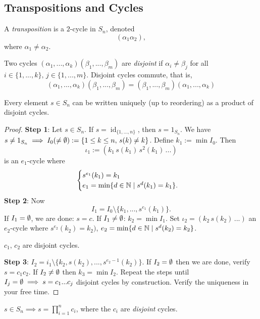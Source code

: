 \subsection{Transpositions and Cycles}
\begin{definition}[Transpositions]
   A \emph{transposition} is a $2$-cycle in $S_n$, denoted  \[
       (\alpha_1 \alpha_2),
   \]
   where $\alpha_1 \neq \alpha_2$.
\end{definition}

\begin{definition}
    Two cycles $(\alpha_1,...,\alpha_k)(\beta_1,...,\beta_m)$ are \emph{disjoint} if $\alpha_i \neq \beta_j$ for all $i \in \{1,...,k\}, \, j \in \{1,...,m\}$. 
    Disjoint cycles commute, that is, \[
        (\alpha_1,...,\alpha_k)(\beta_1,...,\beta_m)=(\beta_1,...,\beta_m)(\alpha_1,...,\alpha_k)
    \]
\end{definition}
\begin{lemma}
    Every element $s\in S_n$ can be written uniquely (up to reordering) as a product of disjoint cycles.
\end{lemma}
\begin{proof}
    \textbf{Step 1}: Let $s\in S_n$. If $s=\operatorname{id}_{\{1,...,n\} }$, then $s=1_{S_n}$. We have $s \neq 1_{S_n} \implies I_0 (\neq \emptyset) := \{1 \leq k \leq n, \, s(k) \neq k\} $. Define $k_1 := \operatorname{min}I_0.$ Then \[
        \iota_1 := ( k_1 \,s(k_1) \, s^2(k_1)\, ... ) 
    \]
   is an $e_1$-cycle where \[
   \begin{cases}
       s^{e_1}(k_1) =k_1 \\
       e_1=\operatorname{min} \{d \in \mathbb{N}  \mid s^{d}(k_1)=k_1\}.
   \end{cases}
   \]
   \textbf{Step 2}: Now \[
       I_1=I_0\setminus \{k_1,...,s^{e_1}(k_1)\}.
   \]
   If $I_1=\emptyset$, we are done: $s = c.$ If $I_1\neq\emptyset$: $k_2=\operatorname{min}I_1$. Set $\iota_2=(k_2\,s(k_2)\,...)$ an $e_2$-cycle where $s^{e_2}(k_2)=k_2)$, $e_2=\operatorname{min}\{d\in \mathbb{N} \mid s^{d}(k_2)=k_2\} $. 
   \begin{note}
       $c_1, \, c_2$ are disjoint cycles.
   \end{note}
\noindent\textbf{Step 3}: $I_2=i_1\setminus \{k_2,s(k_2),...,s^{e_2-1}(k_2)\} $. If $I_2=\emptyset$ then we are done, verify $s=c_1c_2$. If $I_2\neq\emptyset$ then $k_3=\operatorname{min}I_2$. Repeat the steps until $I_j = \emptyset \implies s=c_1 ... c_j$ disjoint cycles by construction. Verify the uniqueness in your free time.
\end{proof}
\begin{note}
    $s\in S_n \implies s=\prod_{i=1}^{n}c_i$, where the $c_{i}$ are \emph{disjoint} cycles.
\end{note}

